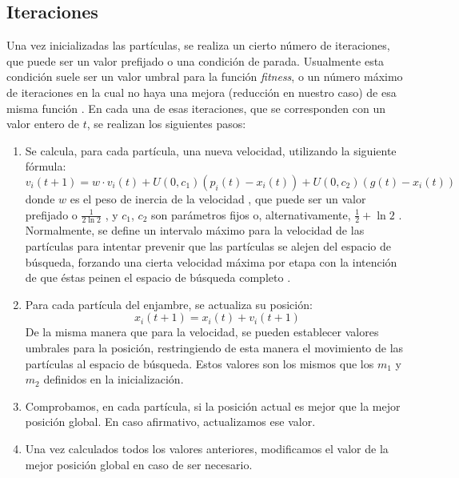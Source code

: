 \subsection{Iteraciones}

Una vez inicializadas las partículas, se realiza un cierto número de iteraciones, que puede ser un valor prefijado o
una condición de parada. Usualmente esta condición suele ser un valor umbral para la función \textit{fitness}, o un
número máximo de iteraciones en la cual no haya una mejora (reducción en nuestro caso) de esa misma función 
\cite{clerc_12}. En cada una de esas iteraciones, que se corresponden con un valor entero de $t$, se realizan los 
siguientes pasos:
\begin{enumerate}
    \item Se calcula, para cada partícula, una nueva velocidad, utilizando la siguiente fórmula:
    \begin{equation}\label{eq:pso-vel}
        v_i(t+1)=w\cdot v_i(t) + U(0,c_1)(p_i(t)-x_i(t))+U(0,c_2)(g(t)-x_i(t))
    \end{equation}
    donde $w$ es el peso de inercia de la velocidad \cite{gad_2022}, que puede ser un valor prefijado o 
    $\frac{1}{2\ln{2}}$ \cite{clerc_12}, y $c_1$, $c_2$ son parámetros fijos o, alternativamente, $\frac{1}{2}+\ln{2}$
    \cite{clerc_12}. Normalmente, se define un intervalo máximo para la velocidad de las partículas para intentar 
    prevenir que las partículas se alejen del espacio de búsqueda, forzando una cierta velocidad máxima por etapa con 
    la intención de que éstas peinen el espacio de búsqueda completo \cite{gad_2022}.
    \item Para cada partícula del enjambre, se actualiza su posición:
    \begin{equation}\label{eq:pso-pos}
        x_i(t+1)=x_i(t)+v_i(t+1)
    \end{equation}
    De la misma manera que para la velocidad, se pueden establecer valores umbrales para la posición, restringiendo
    de esta manera el movimiento de las partículas al espacio de búsqueda. Estos valores son los mismos que los $m_1$
    y $m_2$ definidos en la inicialización.
    \item Comprobamos, en cada partícula, si la posición actual es mejor que la mejor posición global. En caso
    afirmativo, actualizamos ese valor.
    \item Una vez calculados todos los valores anteriores, modificamos el valor de la mejor posición global en caso de
    ser necesario.
\end{enumerate}

